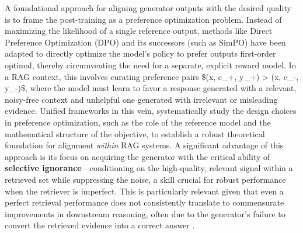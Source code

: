 \documentclass[11pt,a4paper]{article}
\begin{document}
A foundational approach for aligning generator outputs with the desired quality is to frame the post-training as a preference optimization problem. Instead of maximizing the likelihood of a single reference output, methods like Direct Preference Optimization (DPO) and its successors (such as SimPO) have been adapted to directly optimize the model's policy to prefer outputs first-order optimal, thereby circumventing the need for a separate, explicit reward model. In a RAG context, this involves curating preference pairs \$(x, c\_+, y\_+) > (x, c\_-, y\_-)\$, where the model must learn to favor a response generated with a relevant, noisy-free context and unhelpful one generated with irrelevant or misleading evidence. Unified frameworks in this vein, systematically study the design choices in preference optimization, such as the role of the reference model and the mathematical structure of the objective, to establish a robust theoretical foundation for alignment \emph{within} RAG systems. A significant advantage of this approach is its focus on acquiring the generator with the critical ability of \textbf{selective ignorance}---conditioning on the high-quality, relevant signal within a retrieved set while suppressing the noise, a skill crucial for robust performance when the retriever is imperfect. This is particularly relevant given that even a perfect retrieval performance does not consistently translate to commensurate improvements in downstream reasoning, often due to the generator's failure to convert the retrieved evidence into a correct answer \cite{arxiv:2604.27852v1}.
\end{document}
